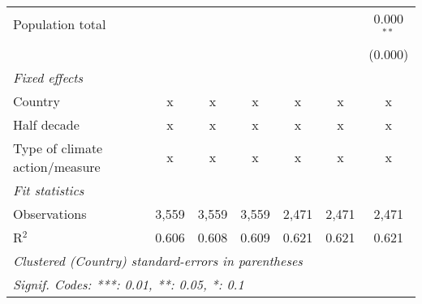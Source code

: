 \begin{tabular}{lcccccc}
   Population total                                              &         &                &                &                &                & 0.000$^{**}$\\   
                                                                 &         &                &                &                &                & (0.000)\\   
   \emph{Fixed effects}\\
   Country                                                       & x       & x              & x              & x              & x              & x\\  
   Half decade                                                   & x       & x              & x              & x              & x              & x\\  
   Type of climate action/measure                                & x       & x              & x              & x              & x              & x\\  
   \midrule \emph{Fit statistics}\\
   Observations                                                  & 3,559   & 3,559          & 3,559          & 2,471          & 2,471          & 2,471\\  
   R$^2$                                                         & 0.606   & 0.608          & 0.609          & 0.621          & 0.621          & 0.621\\  
   \midrule
   \multicolumn{7}{l}{\emph{Clustered (Country) standard-errors in parentheses}}\\
   \multicolumn{7}{l}{\emph{Signif. Codes: ***: 0.01, **: 0.05, *: 0.1}}\\
\end{tabular}
\par\endgroup


